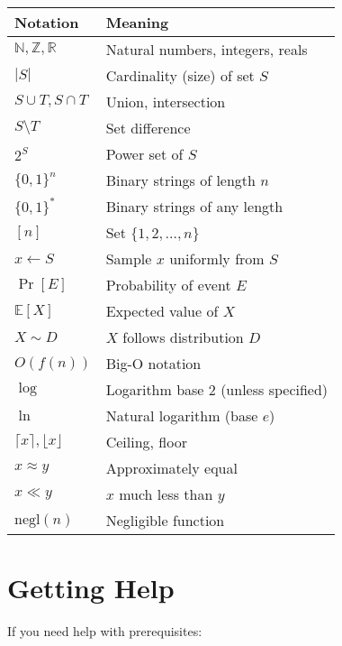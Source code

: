 \begin{center}
\begin{tabular}{|l|l|}
\hline
\textbf{Notation} & \textbf{Meaning} \\
\hline
$\mathbb{N}, \mathbb{Z}, \mathbb{R}$ & Natural numbers, integers, reals \\
$|S|$ & Cardinality (size) of set $S$ \\
$S \cup T, S \cap T$ & Union, intersection \\
$S \setminus T$ & Set difference \\
$2^S$ & Power set of $S$ \\
$\{0,1\}^n$ & Binary strings of length $n$ \\
$\{0,1\}^*$ & Binary strings of any length \\
$[n]$ & Set $\{1, 2, \ldots, n\}$ \\
$x \leftarrow S$ & Sample $x$ uniformly from $S$ \\
$\Pr[E]$ & Probability of event $E$ \\
$\mathbb{E}[X]$ & Expected value of $X$ \\
$X \sim D$ & $X$ follows distribution $D$ \\
$O(f(n))$ & Big-O notation \\
$\log$ & Logarithm base 2 (unless specified) \\
$\ln$ & Natural logarithm (base $e$) \\
$\lceil x \rceil, \lfloor x \rfloor$ & Ceiling, floor \\
$x \approx y$ & Approximately equal \\
$x \ll y$ & $x$ much less than $y$ \\
$\text{negl}(n)$ & Negligible function \\
\hline
\end{tabular}
\end{center}

\section{Getting Help}

If you need help with prerequisites:

